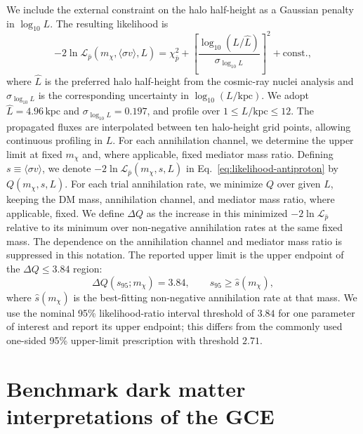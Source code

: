 \documentclass[superscriptaddress,
showpacs,preprintnumbers,nofootinbib,eqsecnum,amsmath,amssymb,aps,11pt, groupedaddress, floatfix]{revtex4-2}
\begin{document}
We include the external constraint on the halo half-height
as a Gaussian penalty in $\log_{10}L$.
The resulting likelihood is
\begin{equation}
-2\ln\mathcal{L}_{\bar p}
(m_\chi,\langle\sigma v\rangle,L)
=
\chi^2_{\bar p}
+
\left[
\frac{\log_{10}(L/\widehat{L})}
{\sigma_{\log_{10}L}}
\right]^2
+
\mathrm{const.},
\label{eq:likelihood-antiproton}
\end{equation}
where $\widehat{L}$ is the preferred halo half-height from
the cosmic-ray nuclei analysis and $\sigma_{\log_{10}L}$
is the corresponding uncertainty in
$\log_{10}(L/\mathrm{kpc})$.
We adopt $\widehat{L}=4.96\,\mathrm{kpc}$ and
$\sigma_{\log_{10}L}=0.197$, and profile over
$1\leq L/\mathrm{kpc}\leq12$.
The propagated fluxes are interpolated between ten halo-height
grid points, allowing continuous profiling in $L$.
For each annihilation channel, we determine the upper limit
at fixed $m_\chi$ and, where applicable, fixed mediator mass ratio.
Defining $s\equiv\langle\sigma v\rangle$, we denote $-2\ln\mathcal{L}_{\bar p}(m_\chi,s,L)$ in Eq.~\eqref{eq:likelihood-antiproton} by $Q(m_\chi,s,L)$. For each trial annihilation rate, we minimize $Q$ over given $L$, keeping the DM mass, annihilation channel, and mediator mass ratio, where applicable, fixed. We define $\Delta Q$ as the increase in this minimized $-2\ln\mathcal{L}_{\bar p}$ relative to its minimum over non-negative annihilation rates at the same fixed mass. The dependence on the annihilation channel and mediator mass ratio is suppressed in this notation.
The reported upper limit is the upper endpoint of the
$\Delta Q\leq3.84$ region:
\begin{equation}
\Delta Q(s_{95};m_\chi)=3.84,
\qquad
s_{95}\geq\widehat{s}(m_\chi),
\label{eq:antiproton-upper-limit}
\end{equation}
where $\widehat{s}(m_\chi)$ is the best-fitting non-negative
annihilation rate at that mass.
We use the nominal 95\% likelihood-ratio interval threshold
of $3.84$ for one parameter of interest and report its upper
endpoint; this differs from the commonly used one-sided
95\% upper-limit prescription with threshold $2.71$.



\section{Benchmark dark matter interpretations of the GCE}
\label{sec:DMinterp}
\end{document}
